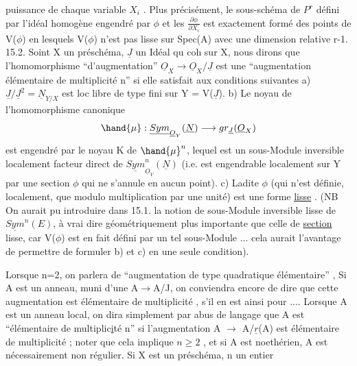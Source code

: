 
puissance de chaque variable $X_i$ . Plus précis\unsure{}ément, le sous-schéma
de $P^r$ défini par l'idéal homogène engendré par  $\phi$ et les $\frac{\partial\phi}{\partial X_i}$ est
exactement formé des points de V($\phi$) en lesquels V($\phi$) n'est pas lisse sur
Spec(A) avec une dimension relative r-1.
15.2. Soint X un préschéma, $\underline{J}$ un Idéal qu coh  sur X, nous dirons que
l'homomorphisme ``d'augmentation'' $\underline{O}_X \to \underline{O}_X/\underline{J}$ est une ``augmentation
élémentaire de multiplicité n'' si elle satisfait aux conditions suivantes
a) $\underline{J}/\underline{J}^2 = \underline{N}_{Y/X}$ est loc libre de type fini sur Y = V($\underline{J}$).
b) Le noyau de l'homomorphisme canonique
\[ \hand{\mu} : \underline{Sym}_{\underline{O}_Y}(\underline{N}) \longrightarrow gr_{\underline{J}}(\underline{O}_X) \]
est engendré par le noyau K de $\hand{\mu}^n$, lequel est un sous-Module inversible
localement facteur direct de $\underline{Sym}^n_{\underline{O}_Y}(\underline{N})$ (i.e. est engendrable localement
sur Y par une section $\phi$ qui ne s'annule en aucun point).
c) Ladite $\phi$ (qui n'est définie, localement, que modulo multiplication
par une unité) est une forme \uline{lisse} . (NB On aurait pu introduire dans
\placedmargin{\textbar}15.1. la notion de sous-Module inversible lisse de $\underline{Sym}^n(E)$, à vrai dire
géométriquement plus importante que celle de \uline{section} lisse, car V($\phi$) est
en fait défini par un tel sous-Module ... cela aurait l'avantage de
permettre de formuler b) et c) en une seule condition).

Lorsque n=2, on parlera de ``augmentation de type quadratique élémentaire'' ,
Si A est un anneau,  muni d'une  A$\to$A/J,
on conviendra encore de dire que cette augmentation est élémentaire de
multiplicité  , s'il en est ainsi pour .... Lorsque A est un anneau
local, on dira simplement par abus de langage que A est ``élémentaire de
multiplic\uline{i}té n'' si l'augmentation A $\to$ A/$\underline{r}$(A) est élémentaire de
multiplicité ; noter que cela implique $n \geqslant 2$ , et si A est noethérien,
A est nécessairement non régulier. Si X est un préschéma, n un entier

